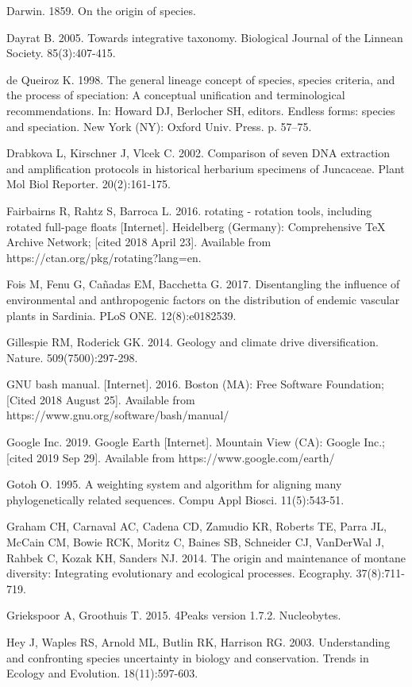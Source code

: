 Darwin. 1859. On the origin of species.

Dayrat B. 2005. Towards integrative taxonomy. Biological Journal of the Linnean Society. 85(3):407-415.

de Queiroz K. 1998. The general lineage concept of species, species criteria, and the process of speciation: A conceptual unification and terminological recommendations. In: Howard DJ, Berlocher SH, editors. Endless forms: species and speciation. New York (NY): Oxford Univ. Press. p. 57–75.

Drabkova L, Kirschner J, Vlcek C. 2002. Comparison of seven DNA extraction and amplification protocols in historical herbarium specimens of Juncaceae. Plant Mol Biol Reporter. 20(2):161-175.


Fairbairns R, Rahtz S, Barroca L. 2016. rotating - rotation tools, including rotated full-page floats [Internet]. Heidelberg (Germany): Comprehensive TeX Archive Network; [cited 2018 April 23]. Available from https://ctan.org/pkg/rotating?lang=en.

Fois M, Fenu G, Cañadas EM, Bacchetta G. 2017. Disentangling the influence of environmental and anthropogenic factors on the distribution of endemic vascular plants in Sardinia. PLoS ONE. 12(8):e0182539.

Gillespie RM, Roderick GK. 2014. Geology and climate drive diversification. Nature. 509(7500):297-298.

GNU bash manual. [Internet]. 2016. Boston (MA): Free Software Foundation; [Cited 2018 August 25]. Available from https://www.gnu.org/software/bash/manual/

Google Inc. 2019. Google Earth [Internet]. Mountain View (CA): Google Inc.; [cited 2019 Sep 29]. Available from https://www.google.com/earth/

Gotoh O. 1995. A weighting system and algorithm for aligning many phylogenetically related sequences. Compu Appl Biosci. 11(5):543-51.

Graham CH, Carnaval AC, Cadena CD, Zamudio KR, Roberts TE, Parra JL, McCain CM, Bowie RCK, Moritz C, Baines SB, Schneider CJ, VanDerWal J, Rahbek C, Kozak KH, Sanders NJ. 2014. The origin and maintenance of montane diversity: Integrating evolutionary and ecological processes. Ecography. 37(8):711-719.

Griekspoor A, Groothuis T. 2015. 4Peaks version 1.7.2. Nucleobytes.

Hey J, Waples RS, Arnold ML, Butlin RK, Harrison RG. 2003. Understanding and confronting species uncertainty in biology and conservation. Trends in Ecology and Evolution. 18(11):597-603.

